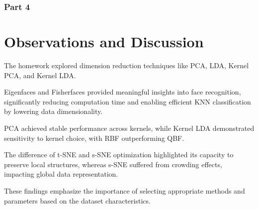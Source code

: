 \documentclass{homework}
\begin{document}
\subsubsection{Part 4}

\section{Observations and Discussion}

The homework explored dimension reduction techniques like PCA, LDA, Kernel PCA, and Kernel LDA.

Eigenfaces and Fisherfaces provided meaningful insights into face recognition, significantly reducing computation time and enabling efficient KNN classification by lowering data dimensionality.

PCA achieved stable performance across kernels, while Kernel LDA demonstrated sensitivity to kernel choice, with RBF outperforming QBF.

The difference of t-SNE and s-SNE optimization highlighted its capacity to preserve local structures, whereas s-SNE suffered from crowding effects, impacting global data representation.

These findings emphasize the importance of selecting appropriate methods and parameters based on the dataset characteristics.
\end{document}
